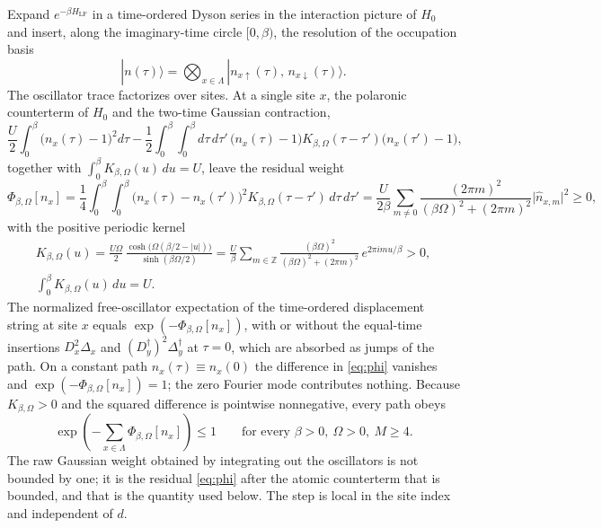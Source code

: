\documentclass[11pt]{article}
\theoremstyle{plain}
\theoremstyle{definition}
\newcommand{\Dop}{\Delta}
\begin{document}
Expand $e^{-\beta H_{\mathrm{LF}}}$ in a time-ordered Dyson series in the
interaction picture of $H_0$ and insert, along the imaginary-time circle
$[0,\beta)$, the resolution of the occupation basis
\begin{equation}\label{eq:path}
 |n(\tau)\rangle=\bigotimes_{x\in\Lambda}
 |n_{x\uparrow}(\tau),\,n_{x\downarrow}(\tau)\rangle .
\end{equation}
The oscillator trace factorizes over sites. At a single site $x$, the polaronic
counterterm of $H_0$ and the two-time Gaussian contraction,
\begin{equation}\label{eq:contraction}
 \frac U2\int_0^\beta\!\bigl(n_x(\tau)-1\bigr)^2d\tau
 -\frac12\int_0^\beta\!\!\int_0^\beta d\tau\,d\tau'\,
 \bigl(n_x(\tau)-1\bigr)K_{\beta,\Omega}(\tau-\tau')
 \bigl(n_x(\tau')-1\bigr),
\end{equation}
together with $\int_0^\beta K_{\beta,\Omega}(u)\,du=U$, leave the residual weight
\begin{equation}\label{eq:phi}
 \Phi_{\beta,\Omega}[n_x]=\frac14\int_0^\beta\!\!\!\int_0^\beta
 \bigl(n_x(\tau)-n_x(\tau')\bigr)^2K_{\beta,\Omega}(\tau-\tau')\,d\tau\,d\tau'
 =\frac{U}{2\beta}\sum_{m\ne0}\frac{(2\pi m)^2}{(\beta\Omega)^2+(2\pi m)^2}
 \bigl|\hat n_{x,m}\bigr|^2\ge0,
\end{equation}
with the positive periodic kernel
\begin{equation}\label{eq:kernel}
\begin{gathered}
 K_{\beta,\Omega}(u)=\frac{U\Omega}{2}\,
 \frac{\cosh\bigl(\Omega(\beta/2-|u|)\bigr)}{\sinh(\beta\Omega/2)}
 =\frac U\beta\sum_{m\in\mathbb{Z}}
 \frac{(\beta\Omega)^2}{(\beta\Omega)^2+(2\pi m)^2}\,e^{2\pi imu/\beta}>0,\\
 \int_0^\beta K_{\beta,\Omega}(u)\,du=U .
\end{gathered}
\end{equation}
The normalized free-oscillator expectation of the time-ordered displacement string
at site $x$ equals $\exp(-\Phi_{\beta,\Omega}[n_x])$, with or without the equal-time
insertions $D_x^2\Dop_x$ and $(D_y^\dagger)^2\Dop_y^\dagger$ at $\tau=0$, which are
absorbed as jumps of the path. On a constant path $n_x(\tau)\equiv n_x(0)$ the
difference in \eqref{eq:phi} vanishes and $\exp(-\Phi_{\beta,\Omega}[n_x])=1$; the
zero Fourier mode contributes nothing. Because $K_{\beta,\Omega}>0$ and the squared
difference is pointwise nonnegative, every path obeys
\begin{equation}\label{eq:contractionbound}
 \exp\!\left(-\sum_{x\in\Lambda}\Phi_{\beta,\Omega}[n_x]\right)\le1
 \qquad\text{for every }\beta>0,\ \Omega>0,\ M\ge4 .
\end{equation}
The raw Gaussian weight obtained by integrating out the oscillators is not bounded
by one; it is the residual \eqref{eq:phi} after the atomic counterterm that is
bounded, and that is the quantity used below. The step is local in the site index
and independent of $d$.
\end{document}
